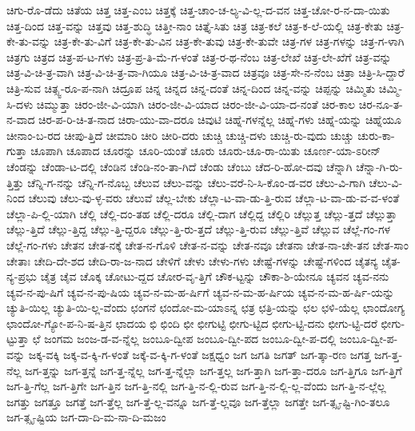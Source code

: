 {ಚಿಗು-ರೊ-ಡೆದು
ಚಿತೆಯ
ಚಿತ್ತ
ಚಿತ್ತ-ಎಂಬ
ಚಿತ್ತಕ್ಕೆ
ಚಿತ್ತ-ಚಾಂ-ಚ-ಲ್ಯ-ವಿ-ಲ್ಲ-ದ-ವನ
ಚಿತ್ತ-ಚೋ-ರ-ನ-ದಾ-ಯಿತು
ಚಿತ್ತ-ದಿಂದ
ಚಿತ್ತ-ವನ್ನು
ಚಿತ್ತವು
ಚಿತ್ತ-ಶುದ್ಧಿ
ಚಿತ್ತೀ-ನಾಂ
ಚಿತ್ತೈ-ಸಿತು
ಚಿತ್ರ
ಚಿತ್ರ-ಕಲೆ
ಚಿತ್ರ-ಕ-ಲೆ-ಯಲ್ಲಿ
ಚಿತ್ರ-ಕೇತು
ಚಿತ್ರ-ಕೇ-ತು-ವನ್ನು
ಚಿತ್ರ-ಕೇ-ತು-ವಿಗೆ
ಚಿತ್ರ-ಕೇ-ತು-ವಿನ
ಚಿತ್ರ-ಕೇ-ತುವು
ಚಿತ್ರ-ಕೇ-ತುವೇ
ಚಿತ್ರ-ಗಳ
ಚಿತ್ರ-ಗಳನ್ನು
ಚಿತ್ರ-ಗ-ಳಾಗಿ
ಚಿತ್ರಗು
ಚಿತ್ರದ
ಚಿತ್ರ-ಪ-ಟ-ಗಳು
ಚಿತ್ರ-ಪ್ರ-ತಿ-ಮೆ-ಗ-ಳಂತೆ
ಚಿತ್ರ-ರ-ಥ-ನೆಂಬ
ಚಿತ್ರ-ಲೇಖೆ
ಚಿತ್ರ-ಲೇ-ಖೆಗೆ
ಚಿತ್ರ-ವನ್ನು
ಚಿತ್ರ-ವಿ-ಚಿ-ತ್ರ-ವಾಗಿ
ಚಿತ್ರ-ವಿ-ಚಿ-ತ್ರ-ವಾ-ಗಿಯೂ
ಚಿತ್ರ-ವಿ-ಚಿ-ತ್ರ-ವಾದ
ಚಿತ್ರವೂ
ಚಿತ್ರ-ಸೇ-ನ-ನೆಂಬ
ಚಿತ್ರಾ
ಚಿತ್ರಿ-ಸಿ-ದ್ದಾರೆ
ಚಿತ್ರಿ-ಸುವ
ಚಿತ್ಸ್ವ-ರೂ-ಪ-ನಾಗಿ
ಚಿದ್ರೂಪ
ಚಿನ್ನ
ಚಿನ್ನದ
ಚಿನ್ನ-ದಂತೆ
ಚಿನ್ನ-ದಿಂದ
ಚಿನ್ನ-ವನ್ನು
ಚಿಪ್ಪನ್ನು
ಚಿಮ್ಮಿತು
ಚಿಮ್ಮಿ-ಸಿ-ದಳು
ಚಿಮ್ಮುತ್ತಾ
ಚಿರಂ-ಜೀ-ವಿ-ಯಾಗಿ
ಚಿರಂ-ಜೀ-ವಿ-ಯಾದ
ಚಿರಂ-ಜೀ-ವಿ-ಯಾ-ದ-ನಂತೆ
ಚಿರ-ಕಾಲ
ಚಿರ-ನೂ-ತ-ನ-ವಾದ
ಚಿರ-ಪ-ರಿ-ಚಿ-ತ-ನಾದ
ಚಿರಾ-ಯು-ವಾ-ದರೂ
ಚಿವುಟಿ
ಚಿಹ್ನೆ-ಗಳನ್ನೆಲ್ಲ
ಚಿಹ್ನೆ-ಗಳು
ಚಿಹ್ನೆ-ಯನ್ನು
ಚಿಹ್ನೆಯೂ
ಚೀನಾಂ-ಬ-ರದ
ಚೀಪು-ತ್ತಿದೆ
ಚೀಮಾರಿ
ಚೀರಿ
ಚೀರಿ-ದರು
ಚುಚ್ಚಿ
ಚುಚ್ಚಿ-ದಳು
ಚುಚ್ಚಿ-ರು-ವುದು
ಚುಚ್ಚು
ಚುರು-ಕಾ-ಗುತ್ತಾ
ಚೂಪಾಗಿ
ಚೂಪಾದ
ಚೂರನ್ನು
ಚೂರಿ-ಯಂತೆ
ಚೂರು
ಚೂರು-ಚೂ-ರಾ-ಯಿತು
ಚೂರ್ಣ-ಯಾ-ಽರೀನ್
ಚೆಂಡನ್ನು
ಚೆಂಡಾ-ಟ-ದಲ್ಲಿ
ಚೆಂಡಿನ
ಚೆಂಡಿ-ನಂ-ತಾ-ಗಿದೆ
ಚೆಂಡು
ಚೆಂಬು
ಚೆದ-ರಿ-ಹೋ-ದವು
ಚೆನ್ನಾಗಿ
ಚೆನ್ನಾ-ಗಿ-ರು-ತ್ತಿತ್ತು
ಚೆನ್ನಿ-ಗ-ನನ್ನು
ಚೆನ್ನಿ-ಗ-ನೊಬ್ಬ
ಚೆಲುವ
ಚೆಲು-ವನ್ನು
ಚೆಲು-ವರೆ-ನಿ-ಸಿ-ಕೊಂ-ಡ-ವರ
ಚೆಲು-ವಿ-ಗಾಗಿ
ಚೆಲು-ವಿ-ನಿಂದ
ಚೆಲುವು
ಚೆಲು-ವು-ಳ್ಳ-ವರು
ಚೆಲುವೆ
ಚೆಲ್ಲ-ಬೇಕು
ಚೆಲ್ಲಾ-ಟ-ವಾ-ಡು-ತ್ತಿ-ರುವ
ಚೆಲ್ಲಾ-ಟ-ವಾ-ಡು-ವ-ವ-ಳಂತೆ
ಚೆಲ್ಲಾ-ಪಿ-ಲ್ಲಿ-ಯಾಗಿ
ಚೆಲ್ಲಿ
ಚೆಲ್ಲಿ-ದಂ-ತಹ
ಚೆಲ್ಲಿ-ದರೂ
ಚೆಲ್ಲಿ-ದಾಗ
ಚೆಲ್ಲಿದ್ದ
ಚೆಲ್ಲಿರಿ
ಚೆಲ್ಲುತ್ತ
ಚೆಲ್ಲು-ತ್ತದೆ
ಚೆಲ್ಲುತ್ತಾ
ಚೆಲ್ಲು-ತ್ತಿದೆ
ಚೆಲ್ಲು-ತ್ತಿದ್ದ
ಚೆಲ್ಲು-ತ್ತಿ-ದ್ದರೂ
ಚೆಲ್ಲು-ತ್ತಿ-ರು-ತ್ತದೆ
ಚೆಲ್ಲು-ತ್ತಿ-ರುವ
ಚೆಲ್ಲು-ತ್ತಿವೆ
ಚೆಲ್ಲುವ
ಚೆಲ್ಲೆ-ಗಂ-ಗಳ
ಚೆಲ್ಲೆ-ಗಂ-ಗಳು
ಚೇತನ
ಚೇತ-ನಕ್ಕೆ
ಚೇತ-ನ-ಗೊಳಿ
ಚೇತ-ನ-ವನ್ನು
ಚೇತ-ನವೂ
ಚೇತನಾ
ಚೇತ-ನಾ-ಚೇ-ತನ
ಚೇತ-ಸಾಂ
ಚೇತಾಃ
ಚೇದಿ-ದೇ-ಶದ
ಚೇದಿ-ರಾ-ಜ-ನಾದ
ಚೇಳಿಗೆ
ಚೇಳು
ಚೇಳು-ಗಳು
ಚೇಷ್ಟೆ-ಗಳನ್ನು
ಚೇಷ್ಟೆ-ಗಳಿಂದ
ಚೈತನ್ಯ
ಚೈತ-ನ್ಯ-ಪ್ರಭು
ಚೈತ್ರ
ಚೈವ
ಚೊಕ್ಕ
ಚೋಟು-ದ್ದದ
ಚೋರ-ವೃ-ತ್ತಿಗೆ
ಚೌಕ-ಟ್ಟನ್ನು
ಚೌಕಾ-ಶಿ-ಯೇನೂ
ಚ್ಯವನ
ಚ್ಯವ-ನನು
ಚ್ಯವ-ನ-ಪು-ಷಿಗೆ
ಚ್ಯವ-ನ-ಪು-ಷಿಯ
ಚ್ಯವ-ನ-ಮ-ಹ-ರ್ಷಿಗೆ
ಚ್ಯವ-ನ-ಮ-ಹ-ರ್ಷಿಯ
ಚ್ಯವ-ನ-ಮ-ಹ-ರ್ಷಿ-ಯನ್ನು
ಚ್ಯುತಿ-ಯಿಲ್ಲ
ಚ್ಯುತಿ-ಯಿ-ಲ್ಲ-ವೆಂದು
ಛಂಗನೆ
ಛಂದೋ-ಮ-ಯಾಽನ್ನ
ಛತ್ರ
ಛತ್ರಿ-ಯನ್ನು
ಛಲ
ಛಳಿ-ಯೆಲ್ಲ
ಛಾಂದೋಗ್ಯ
ಛಾಂದೋ-ಗ್ಯೋ-ಪ-ನಿ-ಷ-ತ್ತಿನ
ಛಾದಯ
ಛಿ
ಛಿಂದಿ
ಛೀ
ಛೀಗುಟ್ಟಿ
ಛೀಗು-ಟ್ಟಿದ
ಛೀಗು-ಟ್ಟಿ-ದನು
ಛೀಗು-ಟ್ಟಿ-ದರೆ
ಛೀಗು-ಟ್ಟುತ್ತಾ
ಛೆ
ಜಂಗಮ
ಜಂಜ-ಡ-ವ-ನ್ನೆಲ್ಲ
ಜಂಬೂ-ದ್ವೀಪ
ಜಂಬೂ-ದ್ವೀ-ಪದ
ಜಂಬೂ-ದ್ವೀ-ಪ-ದಲ್ಲಿ
ಜಂಬೂ-ದ್ವೀ-ಪ-ವನ್ನು
ಜಕ್ಕ-ವಕ್ಕಿ
ಜಕ್ಕ-ವ-ಕ್ಕಿ-ಗ-ಳಂತೆ
ಜಕ್ಕೆ-ವ-ಕ್ಕಿ-ಗ-ಳಂತೆ
ಜಕ್ಷಧ್ವಂ
ಜಗ
ಜಗತಿ
ಜಗತ್
ಜಗ-ತ್ಕಾ-ರಣ
ಜಗತ್ತ
ಜಗ-ತ್ತ-ನೆಲ್ಲ
ಜಗ-ತ್ತನ್ನು
ಜಗ-ತ್ತನ್ನೆ
ಜಗ-ತ್ತ-ನ್ನೆಲ್ಲ
ಜಗ-ತ್ತ-ನ್ನೆಲ್ಲಾ
ಜಗ-ತ್ತಲ್ಲ
ಜಗ-ತ್ತಾಗಿ
ಜಗ-ತ್ತಾ-ದರೂ
ಜಗ-ತ್ತಿಗೂ
ಜಗ-ತ್ತಿಗೆ
ಜಗ-ತ್ತಿ-ಗೆಲ್ಲ
ಜಗ-ತ್ತಿಗೇ
ಜಗ-ತ್ತಿನ
ಜಗ-ತ್ತಿ-ನಲ್ಲಿ
ಜಗ-ತ್ತಿ-ನ-ಲ್ಲಿ-ರುವ
ಜಗ-ತ್ತಿ-ನ-ಲ್ಲಿ-ಲ್ಲ-ವೆಂದು
ಜಗ-ತ್ತಿ-ನ-ಲ್ಲೆಲ್ಲ
ಜಗತ್ತು
ಜಗತ್ತೂ
ಜಗತ್ತೆ
ಜಗ-ತ್ತೆಲ್ಲ
ಜಗ-ತ್ತೆ-ಲ್ಲ-ವನ್ನೂ
ಜಗ-ತ್ತೆ-ಲ್ಲವೂ
ಜಗ-ತ್ತೆಲ್ಲಾ
ಜಗತ್ತೇ
ಜಗ-ತ್ಸೃ-ಷ್ಟಿ-ಗಿಂ-ತಲೂ
ಜಗ-ತ್ಸೃ-ಷ್ಟಿಯ
ಜಗ-ದಾ-ದಿ-ಮ-ನಾ-ದಿ-ಮಜಂ
}
